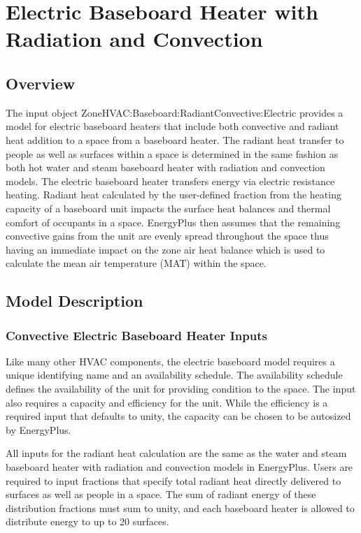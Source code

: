 \section{Electric Baseboard Heater with Radiation and Convection}\label{electric-baseboard-heater-with-radiation-and-convection}

\subsection{Overview}\label{overview-015}

The input object ZoneHVAC:Baseboard:RadiantConvective:Electric provides a model for electric baseboard heaters that include both convective and radiant heat addition to a space from a baseboard heater. The radiant heat transfer to people as well as surfaces within a space is determined in the same fashion as both hot water and steam baseboard heater with radiation and convection models. The electric baseboard heater transfers energy via electric resistance heating. Radiant heat calculated by the user-defined fraction from the heating capacity of a baseboard unit impacts the surface heat balances and thermal comfort of occupants in a space. EnergyPlus then assumes that the remaining convective gains from the unit are evenly spread throughout the space thus having an immediate impact on the zone air heat balance which is used to calculate the mean air temperature (MAT) within the space.

\subsection{Model Description}\label{model-description-009}

\subsubsection{Convective Electric Baseboard Heater Inputs}\label{convective-electric-baseboard-heater-inputs-000}

Like many other HVAC components, the electric baseboard model requires a unique identifying name and an availability schedule. The availability schedule defines the availability of the unit for providing condition to the space. The input also requires a capacity and efficiency for the unit. While the efficiency is a required input that defaults to unity, the capacity can be chosen to be autosized by EnergyPlus.

All inputs for the radiant heat calculation are the same as the water and steam baseboard heater with radiation and convection models in EnergyPlus. Users are required to input fractions that specify total radiant heat directly delivered to surfaces as well as people in a space. The sum of radiant energy of these distribution fractions must sum to unity, and each baseboard heater is allowed to distribute energy to up to 20 surfaces.


